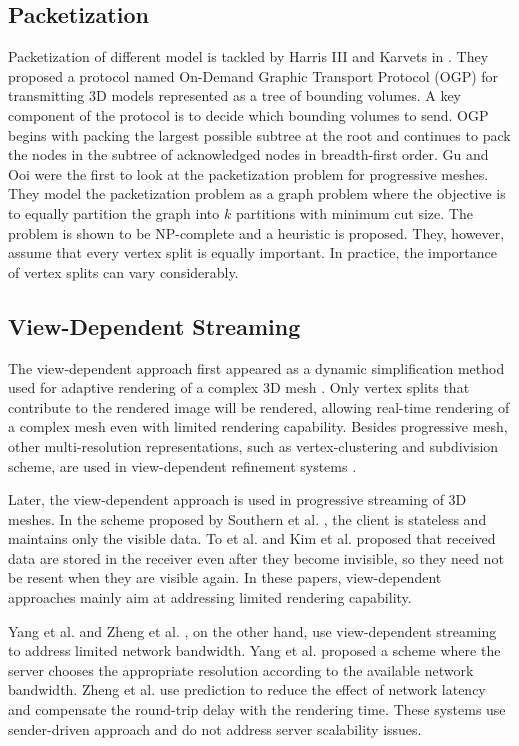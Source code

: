\documentclass[11pt, a4paper]{report}
\begin{document}
    \subsection{Packetization}
    Packetization of different model is tackled by
    Harris III and Karvets in \cite{harris:design}.   They proposed
    a protocol named On-Demand Graphic Transport Protocol (OGP)
    for transmitting 3D models represented as a tree of bounding volumes.
    A key component of the protocol is to decide which bounding volumes
    to send.  OGP begins with packing the largest possible subtree at
    the root and continues to pack the nodes in the subtree of
    acknowledged nodes in breadth-first order.  
    Gu and Ooi \cite{Gu:Packetization} were the first to look at
    the packetization problem for progressive meshes.  They model
    the packetization problem as a graph problem where the objective
    is to equally partition the graph into $k$ partitions with minimum
    cut size.  The problem is shown to be NP-complete and a heuristic
    is proposed.  They, however, assume that every vertex split is
    equally important.  In practice, the importance of vertex splits can
    vary considerably.  
    \subsection{View-Dependent Streaming}
    The view-dependent approach first appeared as 
    a dynamic simplification method used for adaptive rendering of a complex 3D mesh
    \cite{258843, 258847}. Only vertex splits that contribute to the rendered
    image will be rendered, allowing real-time rendering of a complex mesh
    even with limited rendering capability.
    Besides progressive mesh, other multi-resolution representations, 
    such as vertex-clustering  and subdivision scheme,
    are used in view-dependent refinement systems \cite{245627, efficient:Alliez,602344}.

    Later, the view-dependent approach is used in progressive 
	streaming of 3D meshes.     In the scheme proposed by Southern et al. \cite{363375},  the client is stateless and
    maintains only the visible data. 
    To et al. \cite{To1999}
    and Kim et al. \cite{kim:view} proposed that received data are stored
    in the receiver even after they become invisible, 
    so they need not be resent when they are visible again. 
    In these papers, view-dependent approaches mainly aim at addressing
    limited rendering capability. 
    
    Yang et al. \cite{progressive:Yang} and
     Zheng et al. \cite{zheng:interactive}, on the other hand, use
     view-dependent streaming to address limited network bandwidth.
     Yang et al. proposed a scheme where the server chooses the appropriate resolution
     according to the available network bandwidth.
     Zheng et al. \cite{zheng:interactive} use prediction to
     reduce the effect of network latency and 
     compensate the round-trip delay with the rendering time.
     These systems use sender-driven approach and do not address
     server scalability issues.
\end{document}
